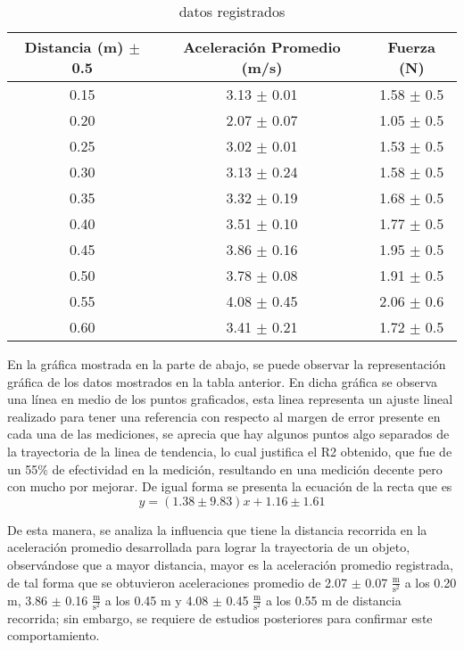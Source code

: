 \documentclass{article}
\begin{document}
\begin{table}[H]
	\centering
	\begin{tabular}{|c|c|c|}
\hline
Distancia (m) $\pm$ 0.5 &Aceleración Promedio (m/s) &Fuerza (N) \\
\hline
0.15 &3.13 $\pm$ 0.01 &1.58 $\pm$ 0.5 \\
\hline
0.20 &2.07 $\pm$ 0.07 &1.05 $\pm$ 0.5 \\
\hline
0.25 &3.02 $\pm$ 0.01 &1.53 $\pm$ 0.5 \\
\hline
0.30 &3.13 $\pm$ 0.24 &1.58 $\pm$ 0.5 \\
\hline
0.35 &3.32 $\pm$ 0.19 &1.68 $\pm$ 0.5 \\
\hline
0.40 &3.51 $\pm$ 0.10 &1.77 $\pm$ 0.5 \\
\hline
0.45 &3.86 $\pm$ 0.16 &1.95 $\pm$ 0.5 \\
\hline
0.50 &3.78 $\pm$ 0.08 &1.91 $\pm$ 0.5 \\
\hline
0.55 &4.08 $\pm$ 0.45 &2.06 $\pm$ 0.6 \\
\hline
0.60 &3.41 $\pm$ 0.21 &1.72 $\pm$ 0.5 \\
\hline
\end{tabular}
\caption{datos registrados}
\label{tab:1}
\end{table}

En la gráfica mostrada en la parte de abajo, se puede observar la representación gráfica de los datos mostrados en la tabla anterior. En dicha gráfica se observa una línea en medio de los puntos graficados, esta linea representa un ajuste lineal realizado para tener una referencia con respecto al margen de error presente en cada una de las mediciones, se aprecia que hay algunos puntos algo separados de la trayectoria de la linea de tendencia, lo cual justifica el R2 obtenido, que fue de un 55$\%$ de efectividad en la medición, resultando en una medición decente pero con mucho por mejorar. De igual forma se presenta la ecuación de la recta que es
\begin{equation*}
	y = (1.38 \pm 9.83)x + 1.16 \pm 1.61
\end{equation*}	

De esta manera, se analiza la influencia que tiene la distancia recorrida en la aceleración promedio desarrollada para lograr la trayectoria de un objeto, observándose que a mayor distancia, mayor es la aceleración promedio registrada, de tal forma que se obtuvieron aceleraciones promedio de 2.07 $\pm$ 0.07 $\frac{\mathrm{m}}{\mathrm{s}^2}$ a los 0.20 m, 3.86 $\pm$ 0.16 $\frac{\mathrm{m}}{\mathrm{s}^2}$ a los 0.45 m y 4.08 $\pm$ 0.45 $\frac{\mathrm{m}}{\mathrm{s}^2}$ a los 0.55 m de distancia recorrida; sin embargo, se requiere de estudios posteriores para confirmar este comportamiento.
\end{document}
